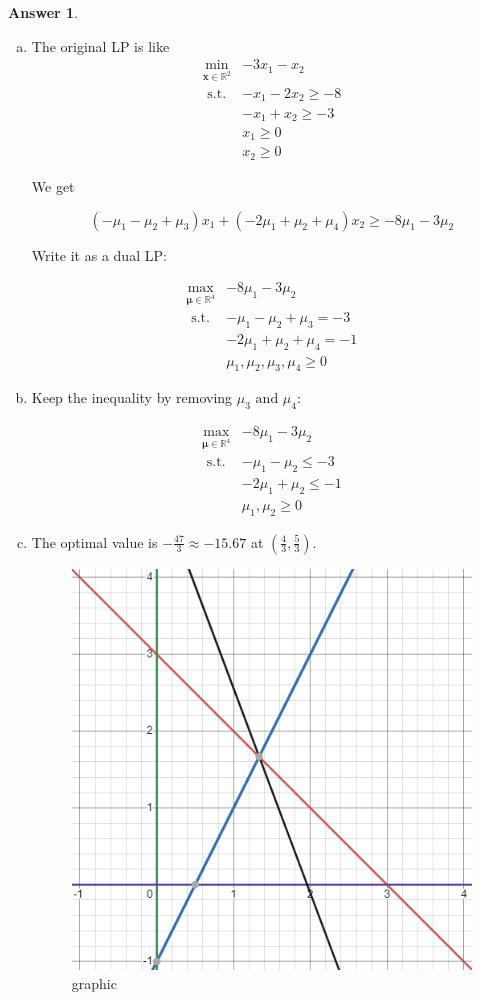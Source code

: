\documentclass{article}
\theoremstyle{definition}
\newtheorem{ans}{Answer}
\begin{document}
	\begin{ans}
		~
		
		\begin{enumerate}[(a)]
		\item The original LP is like
		$$
		\begin{aligned}
			\min _{\boldsymbol{x} \in \mathbb{R}^{2}} & -3 x_{1}-x_{2} \\
			\text { s.t. } & -x_{1}-2 x_{2} \geq -8 \\
			& -x_{1}+x_{2} \geq -3 \\
			& x_{1} \geq 0 \\
			& x_{2} \geq 0
		\end{aligned}
		$$
		
		We get
		
		$$\left(-\mu_1-\mu_2+\mu_3\right) x_1+\left(-2 \mu_1+\mu_2+\mu_4\right) x_2 \geq-8 \mu_1-3 \mu_2$$
		
		Write it as a dual LP:
		
		$$
		\begin{aligned}
			\max _{\boldsymbol{\mu} \in \mathbb{R}^{4}} & -8 \mu_{1}-3\mu_{2} \\
			\text { s.t. } & -\mu_{1}-\mu_{2}+\mu_3 = -3 \\
			& -2\mu_{1}+\mu_{2}+\mu_4 = -1 \\
			& \mu_{1},\mu_2,\mu_3,\mu_4 \geq 0
		\end{aligned}
		$$
		
		\item Keep the inequality by removing $\mu_3 \text{ and }\mu_4$:
		
		$$
		\begin{aligned}
			\max _{\boldsymbol{\mu} \in \mathbb{R}^{4}} & -8 \mu_{1}-3\mu_{2} \\
			\text { s.t. } & -\mu_{1}-\mu_{2} \leq -3 \\
			& -2\mu_{1}+\mu_{2} \leq -1 \\
			& \mu_{1},\mu_2 \geq 0
		\end{aligned}
		$$
		
		\item The optimal value is $-\frac{47}{3}\approx -15.67$ at $(\frac{4}{3}, \frac{5}{3})$.
		\begin{figure}[h]
			\centering
			\includegraphics[width=0.3\linewidth]{../graphic}
			\caption{graphic}
		\end{figure}
		

\end{enumerate}
\end{ans}
\end{document}
